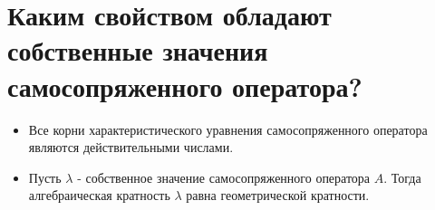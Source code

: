 \documentclass{article}
\begin{document}
\section{Каким свойством обладают собственные значения самосопряженного оператора?}
\begin{itemize}
    \item Все корни характеристического уравнения самосопряженного
    оператора являются действительными числами.
    \item Пусть $\lambda$ - собственное значение самосопряженного
    оператора $A$. Тогда алгебраическая кратность $\lambda$ равна
    геометрической кратности.
\end{itemize}
\end{document}
